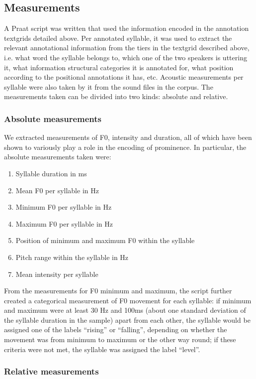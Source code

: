 \documentclass[output=paper]{LSP/langsci}
\begin{document}
\subsection{Measurements} 
A {Praat} script was written that used the information encoded in the annotation textgrids detailed above. Per annotated syllable, it was used to extract the relevant annotational information from the tiers in the textgrid described above, i.e. what word the syllable belongs to, which one of the two speakers is uttering it, what information structural categories it is annotated for, what position according to the positional annotations it has, etc. Acoustic measurements per syllable were also taken by it from the sound files in the corpus. The measurements taken can be divided into two kinds: absolute and relative.

\subsubsection{Absolute measurements} 
We extracted measurements of F0, intensity and duration, all of which have been shown to variously play a role in the encoding of prominence. In particular, the absolute measurements taken were:

\begin{enumerate}
\item  Syllable duration in ms
\item  Mean F0 per syllable in Hz
\item  Minimum F0 per syllable in Hz
\item  Maximum F0 per syllable in Hz
\item  Position of minimum and maximum F0 within the syllable
\item  Pitch range within the syllable in Hz
\item  Mean intensity per syllable
\end{enumerate}

From the measurements for F0 minimum and maximum, the script further created a categorical measurement of F0 movement for each syllable: if minimum and maximum were at least 30 Hz and 100ms (about one standard deviation of the syllable duration in the sample) apart from each other, the syllable would be assigned one of the labels “rising” or “falling”, depending on whether the movement was from minimum to maximum or the other way round; if these criteria were not met, the syllable was assigned the label “level”.  

\subsubsection{Relative measurements}
\label{sec:buc:3.4.2}
\end{document}
